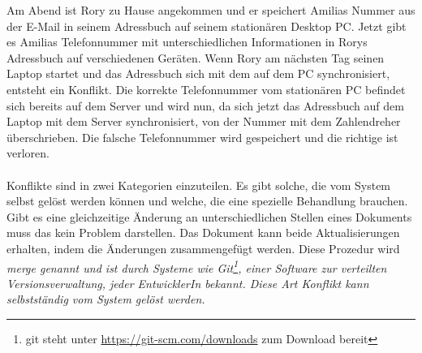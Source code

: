 Am Abend ist Rory zu Hause angekommen und er speichert Amilias Nummer aus der E-Mail in seinem Adressbuch auf seinem stationären Desktop PC.
Jetzt gibt es Amilias Telefonnummer mit unterschiedlichen Informationen in Rorys Adressbuch auf verschiedenen Geräten.
Wenn Rory am nächsten Tag seinen Laptop startet und das Adressbuch sich mit dem auf dem PC synchronisiert, entsteht ein Konflikt.
Die korrekte Telefonnummer vom stationären PC befindet sich bereits auf dem Server und wird nun, da sich jetzt das Adressbuch auf dem Laptop mit dem Server synchronisiert, von der Nummer mit dem Zahlendreher überschrieben.
Die falsche Telefonnummer wird gespeichert und die richtige ist verloren.\\\\
%
%
Konflikte sind in zwei Kategorien einzuteilen. Es gibt solche, die vom System selbst gelöst werden können und welche, die eine spezielle Behandlung brauchen.
Gibt es eine gleichzeitige Änderung an unterschiedlichen Stellen eines Dokuments muss das kein Problem darstellen.
Das Dokument kann beide Aktualisierungen erhalten, indem die Änderungen zusammengefügt werden.
Diese Prozedur wird \it{merge} genannt und ist durch Systeme wie Git\footnote{git steht unter \url{https://git-scm.com/downloads} zum Download bereit}, einer Software zur verteilten Versionsverwaltung, jeder EntwicklerIn bekannt. Diese Art Konflikt kann selbstständig vom System gelöst werden.\\

